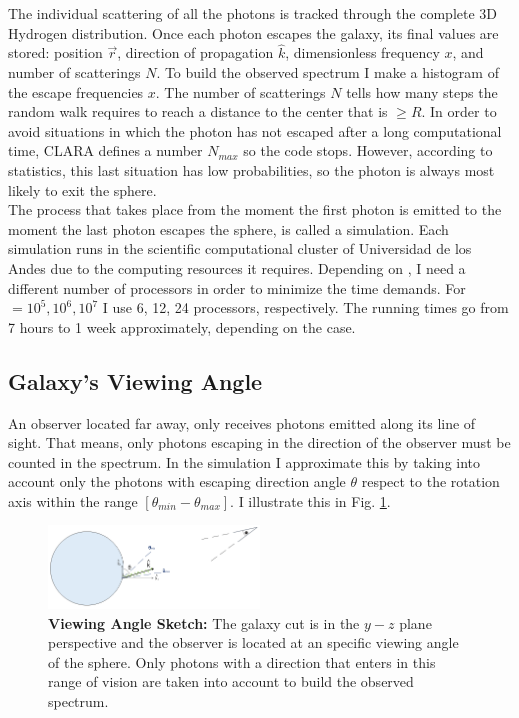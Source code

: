 \documentclass{latex/emulateapj}
\begin{document}
The individual scattering of all the photons is tracked through the complete 3D Hydrogen distribution. Once each photon escapes the galaxy, its final values are stored: position $\vec{r}$, direction of propagation $\hat{k}$, dimensionless frequency $x$, and number of scatterings $N$. To build the observed spectrum I make a histogram of the escape frequencies $x$. The number of scatterings $N$ tells how many steps the random walk requires to reach a distance to the center that is $\geq R$. In order to avoid situations in which the photon has not escaped after a long computational time, CLARA defines a number $N_{max}$ so the code stops. However, according to statistics, this last situation has low probabilities, so the photon is always most likely to exit the sphere. \\

The process that takes place from the moment the first photon is emitted to the moment the last photon escapes the sphere, is called a simulation. Each simulation runs in the scientific computational cluster of Universidad de los Andes due to the computing resources it requires. Depending on \tauh, I need a different number of processors in order to minimize the time demands. For \tauh $=10^5, 10^6, 10^7$ I use 6, 12, 24 processors, respectively. The running times go from 7 hours to 1 week approximately, depending on the case. \\

\subsection{Galaxy's Viewing Angle}
An observer located far away, only receives photons emitted along its line of sight. That means, only photons escaping in the direction of the observer must be counted in the spectrum. In the simulation I approximate this by taking into account only the photons with escaping direction angle $\theta$ respect to the rotation axis within the range $[\theta_{min}-\theta_{max}]$. I illustrate this in Fig. \ref{fig:viewing_angle_sketch}. \\

\begin{figure}[h!]
	\begin{center}
		\includegraphics[width=0.5\textwidth]{./figures/viewing_angle_sketch}
	\end{center}
	\caption{\textbf{Viewing Angle Sketch:} The galaxy cut is in the $y-z$ plane perspective and the observer is located at an specific viewing angle of the sphere. Only photons with a direction that enters in this range of vision are taken into account to build the observed spectrum.
		\label{fig:viewing_angle_sketch}}
\end{figure}
\end{document}
